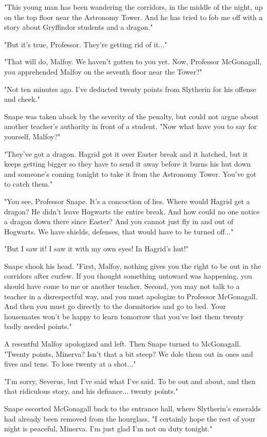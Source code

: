 \documentclass[a4paper,11pt]{article}
\begin{document}
"This young man has been wandering the corridors, in the middle of the night, up on the top floor near the Astronomy Tower. And he has tried to fob me off with a story about Gryffindor students and a dragon."

"But it's true, Professor. They're getting rid of it..."

"That will do, Malfoy. We haven't gotten to you yet. Now, Professor McGonagall, you apprehended Malfoy on the seventh floor near the Tower?"

"Not ten minutes ago. I've deducted twenty points from Slytherin for his offense and cheek."

Snape was taken aback by the severity of the penalty, but could not argue about another teacher's authority in front of a student. "Now what have you to say for yourself, Malfoy?"

"They've got a dragon. Hagrid got it over Easter break and it hatched, but it keeps getting bigger so they have to send it away before it burns his hut down and someone's coming tonight to take it from the Astronomy Tower. You've got to catch them."

"You see, Professor Snape. It's a concoction of lies. Where would Hagrid get a dragon? He didn't leave Hogwarts the entire break. And how could no one notice a dragon down there since Easter? And you cannot just fly in and out of Hogwarts. We have shields, defenses, that would have to be turned off..."

"But I saw it! I saw it with my own eyes! In Hagrid's hut!"

Snape shook his head. "First, Malfoy, nothing gives you the right to be out in the corridors after curfew. If you thought something untoward was happening, you should have come to me or another teacher. Second, you may not talk to a teacher in a disrespectful way, and you must apologize to Professor McGonagall. And then you must go directly to the dormitories and go to bed. Your housemates won't be happy to learn tomorrow that you've lost them twenty badly needed points."

A resentful Malfoy apologized and left. Then Snape turned to McGonagall. "Twenty points, Minerva? Isn't that a bit steep? We dole them out in ones and fives and tens. To lose twenty at a shot..."

"I'm sorry, Severus, but I've said what I've said. To be out and about, and then that ridiculous story, and his defiance... twenty points."

Snape escorted McGonagall back to the entrance hall, where Slytherin's emeralds had already been removed from the hourglass. "I certainly hope the rest of your night is peaceful, Minerva. I'm just glad I'm not on duty tonight."
\end{document}
